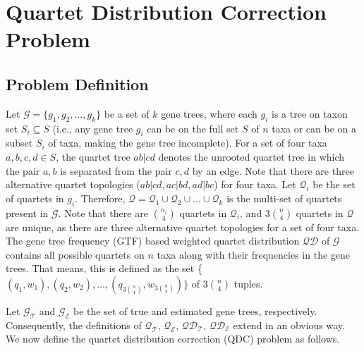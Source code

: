 \documentclass[10pt,a4paper]{article}
\begin{document}

\section{Quartet Distribution Correction Problem}
\subsection{Problem Definition}
Let $\mathcal{G} =  \{g_1, g_2, \ldots, g_k\}$ be a set of $k$ gene trees, where each $g_i$ is a tree on taxon set $S_i \subseteq S$ (i.e., any gene tree $g_i$ can be on the full set $S$ of $n$ taxa or can be on a subset $S_i$ of taxa, making the gene tree incomplete). For a set of four taxa $a,b,c,d \in S$, the quartet tree $ab|cd$ denotes the unrooted quartet tree in which the pair $a, b$ is separated from the pair $c, d$ by an edge. Note that there are three alternative quartet topologies ($ab|cd, ac|bd, ad|bc$) for four taxa.
Let $\mathcal{Q}_i$ be the set of quartets in $g_i$. Therefore, $\mathcal{Q} = \mathcal{Q}_1 \cup \mathcal{Q}_2 \cup \ldots \cup \mathcal{Q}_k$ is the multi-set of quartets present in $\mathcal{G}$. Note that there are $n_i \choose 4$ quartets in $\mathcal{Q}_i$, and $3$$n \choose 4$ quartets in $\mathcal{Q}$ are unique, as there are three alternative quartet topologies for a set of four taxa. %
The gene tree frequency (GTF) based weighted quartet distribution $\mathcal{QD}$ of $\mathcal{G}$ contains all possible quartets on $n$ taxa along with their frequencies in the gene trees. That means, this is defined as the set \{$(q_1,w_1), (q_2,w_2), \ldots, (q_{3{n \choose 4}},w_{3 {n \choose 4}})\}$ of $3$$n \choose 4$ tuples. %

Let $\mathcal{G_T}$ and $\mathcal{G_E}$ be the set of true and estimated gene trees, respectively. Consequently, the definitions of $\mathcal{Q_T}$, $\mathcal{Q_E}$, $\mathcal{QD_T}$, $\mathcal{QD_E}$ extend in an obvious way. %
We now define the quartet distribution correction (QDC) problem as follows.
\end{document}
